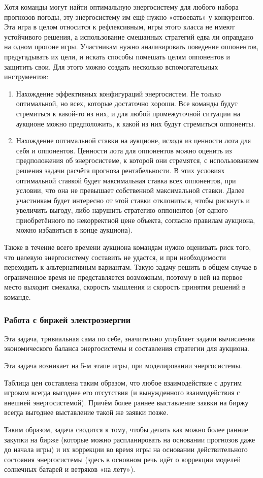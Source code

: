 Хотя команды могут найти оптимальную энергосистему для любого набора прогнозов погоды, эту энергосистему им ещё нужно «отвоевать» у конкурентов. Эта игра в целом относится к рефлексивным, игры этого класса не имеют устойчивого решения, а использование смешанных стратегий едва ли оправдано на одном прогоне игры. Участникам нужно анализировать поведение оппонентов, предугадывать их цели, и искать способы помешать целям оппонентов и защитить свои. Для этого можно создать несколько вспомогательных инструментов:
\begin{enumerate}
    \item Нахождение эффективных конфигураций энергосистем. Не только оптимальной, но всех, которые достаточно хороши. Все команды будут стремиться к какой-то из них, и для любой промежуточной ситуации на аукционе можно предположить, к какой из них будут стремиться оппоненты.
    \item Нахождение оптимальной ставки на аукционе, исходя из ценности лота для себя и оппонентов. Ценности лота для оппонентов можно оценить из предположения об энергосистеме, к которой они стремятся, с использованием решения задачи расчёта прогноза рентабельности. В этих условиях оптимальной ставкой будет максимальная ставка всех оппонентов, при условии, что она не превышает собственной максимальной ставки. Далее участникам будет интересно от этой ставки отклониться, чтобы рискнуть и увеличить выгоду, либо нарушить стратегию оппонентов (от одного приобретённого по некорректной цене объекта, согласно правилам аукциона, можно избавиться в конце аукциона).
\end{enumerate}

Также в течение всего времени аукциона командам нужно оценивать риск того, что целевую энергосистему составить не удастся, и при необходимости переходить к альтернативным вариантам. Такую задачу решить в общем случае в ограниченное время не представляется возможным, поэтому в ней на первое место выходит смекалка, скорость мышления и скорость принятия решений в команде.

\subsubsection*{Работа с биржей электроэнергии}

Эта задача, тривиальная сама по себе, значительно углубляет задачи вычисления экономического баланса энергосистемы и составления стратегии для аукциона.

Эта задача возникает на 5-м этапе игры, при моделировании энергосистемы.

Таблица цен составлена таким образом, что любое взаимодействие с другим игроком всегда выгоднее его отсутствия (и вынужденного взаимодействия с внешней энергосистемой). Причём более раннее выставление заявки на биржу всегда выгоднее выставление такой же заявки позже.

Таким образом, задача сводится к тому, чтобы делать как можно более ранние закупки на бирже (которые можно распланировать на основании прогнозов даже до начала игры) и их коррекции во время игры на основании действительного состояния энергосистемы (здесь в основном речь идёт о коррекции моделей солнечных батарей и ветряков «на лету»).
